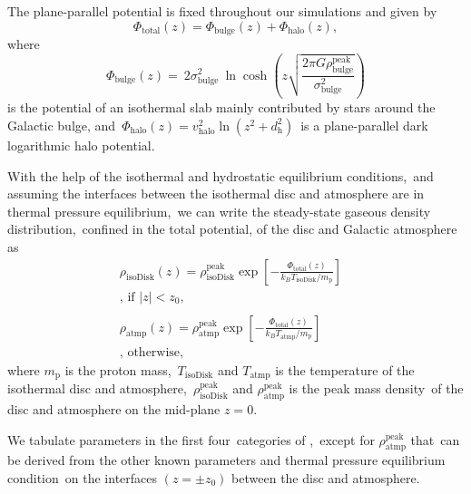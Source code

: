 \documentclass[fleqn,usenatbib,useAMS]{mnras}
\begin{document}
  The plane-parallel potential is fixed throughout our simulations and given by
  \begin{equation}
    \Phi_{\text{total}}(z) = \Phi_{\text{bulge}}(z) + \Phi_{\text{halo}}(z),
  \end{equation}
  where
  \begin{equation}
    \Phi_{\text{bulge}}(z)=\
    2\sigma^2_{\text{bulge}}\
    \ln\cosh\left(z\sqrt{\frac{2\pi G\rho_{\text{bulge}}^{\text{peak}}}{\sigma^2_{\text{bulge}}}}\right)
  \end{equation}
  is the potential of an isothermal slab mainly contributed by stars around the Galactic bulge, and\
  $\Phi_{\text{halo}}(z)=v^2_{\text{halo}}\ln\left(z^2+d^2_{\text{h}}\right)$\
  is a plane-parallel dark logarithmic halo potential.

  With the help of the isothermal and hydrostatic equilibrium conditions,\
  and assuming the interfaces between the isothermal disc and atmosphere are in thermal pressure equilibrium,\
  we can write the steady-state gaseous density distribution,\
  confined in the total potential, of the disc and  Galactic atmosphere as\
  \begin{subequations}
  \begin{align}
     \displaystyle \rho_{\text{isoDisk}}(z) = \rho_{\text{isoDisk}}^{\text{peak}}
     \exp\left[-\frac{\Phi_{\text{total}}(z)}{k_{B}T_{\text{isoDisk}}/m_{\text{p}}}\right]&\label{isothermal-disc-density}\\
     \text{, if $|z| < z_{0}$,}& \nonumber \\
     \nonumber\\
     \displaystyle \rho_{\text{atmp}}(z) = \rho_{\text{atmp}}^{\text{peak}}
     \exp\left[-\frac{\Phi_{\text{total}}(z)}{k_{B}T_{\text{atmp}}/m_{\text{p}}}\right]&\label{isothermal-atmp-density}\\
     \text{, otherwise,}& \nonumber
  \end{align}
  \label{disc-atm-sys}
  \end{subequations}
  where $m_{\text{p}}$ is the proton mass,\
  $T_{\text{isoDisk}}$ and $T_{\text{atmp}}$ is the temperature of the isothermal disc and atmosphere,\
  $\rho_{\text{isoDisk}}^{\text{peak}}$ and $\rho_{\text{atmp}}^{\text{peak}}$ is the peak mass density\
  of the disc and atmosphere on the mid-plane $z=0$.

  We tabulate parameters in the first four\
  categories of ,\
  except for $\rho_{\text{atmp}}^{\text{peak}}$ that\
  can be derived from the other known parameters and thermal pressure equilibrium condition\
  on the interfaces $(z=\pm z_{0})$ between the disc and atmosphere.\
\end{document}

